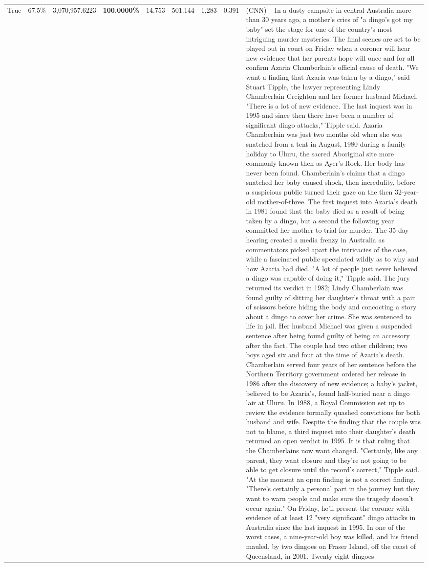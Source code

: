 \begin{table}[H]
\begin{tabular}{lllrlllll}
True & 67.5\% & 3,070,957.6223 & \bfseries \color{red} 100.0000\% & 14.753 & 501.144 & 1,283 & 0.391 & (CNN) -- In a dusty campsite in central Australia more than 30 years ago, a mother's cries of "a dingo's got my baby" set the stage for one of the country's most intriguing murder mysteries. The final scenes are set to be played out in court on Friday when a coroner will hear new evidence that her parents hope will once and for all confirm Azaria Chamberlain's official cause of death. "We want a finding that Azaria was taken by a dingo," said Stuart Tipple, the lawyer representing Lindy Chamberlain-Creighton and her former husband Michael. "There is a lot of new evidence. The last inquest was in 1995 and since then there have been a number of significant dingo attacks," Tipple said. Azaria Chamberlain was just two months old when she was snatched from a tent in August, 1980 during a family holiday to Uluru, the sacred Aboriginal site more commonly known then as Ayer's Rock. Her body has never been found. Chamberlain's claims that a dingo snatched her baby caused shock, then incredulity, before a suspicious public turned their gaze on the then 32-year-old mother-of-three. The first inquest into Azaria's death in 1981 found that the baby died as a result of being taken by a dingo, but a second the following year committed her mother to trial for murder. The 35-day hearing created a media frenzy in Australia as commentators picked apart the intricacies of the case, while a fascinated public speculated wildly as to why and how Azaria had died. "A lot of people just never believed a dingo was capable of doing it," Tipple said. The jury returned its verdict in 1982; Lindy Chamberlain was found guilty of slitting her daughter's throat with a pair of scissors before hiding the body and concocting a story about a dingo to cover her crime. She was sentenced to life in jail. Her husband Michael was given a suspended sentence after being found guilty of being an accessory after the fact. The couple had two other children; two boys aged six and four at the time of Azaria's death. Chamberlain served four years of her sentence before the Northern Territory government ordered her release in 1986 after the discovery of new evidence; a baby's jacket, believed to be Azaria's, found half-buried near a dingo lair at Uluru. In 1988, a Royal Commission set up to review the evidence formally quashed convictions for both husband and wife. Despite the finding that the couple was not to blame, a third inquest into their daughter's death returned an open verdict in 1995. It is that ruling that the Chamberlains now want changed. "Certainly, like any parent, they want closure and they're not going to be able to get closure until the record's correct," Tipple said. "At the moment an open finding is not a correct finding. "There's certainly a personal part in the journey but they want to warn people and make sure the tragedy doesn't occur again." On Friday, he'll present the coroner with evidence of at least 12 "very significant" dingo attacks in Australia since the last inquest in 1995. In one of the worst cases, a nine-year-old boy was killed, and his friend mauled, by two dingoes on Fraser Island, off the coast of Queensland, in 2001. Twenty-eight dingoes 
\end{tabular}
\end{table}
